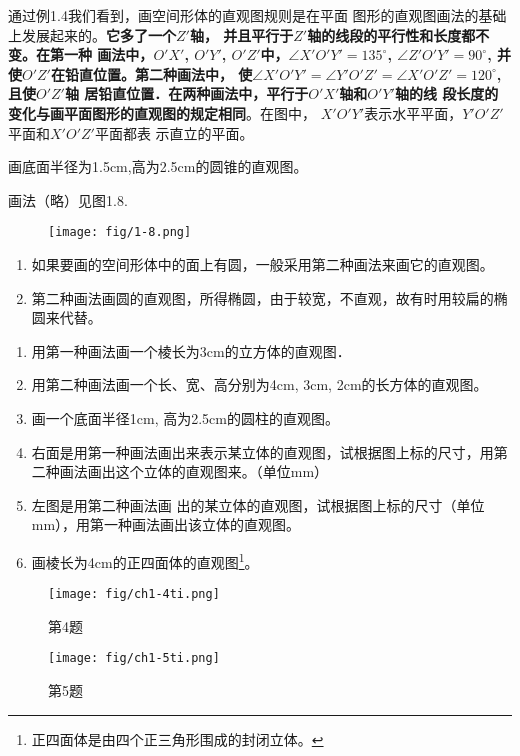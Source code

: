 通过例1.4我们看到，画空间形体的直观图规则是在平面
图形的直观图画法的基础上发展起来的。\textbf{它多了一个$Z'$轴，
并且平行于$Z'$轴的线段的平行性和长度都不变。在第一种
画法中，$O'X'$, $O'Y'$, $O'Z'$中，$\angle X'O'Y'=135^{\circ}$,
 $\angle Z'O'Y'=90^{\circ}$, 并使$O'Z'$在铅直位置。第二种画法中，
使$\angle X'O'Y'=\angle Y'O'Z'=\angle X'O'Z'=120^{\circ}$, 且使$O'Z'$轴
居铅直位置．在两种画法中，平行于$O'X'$轴和$O'Y'$轴的线
段长度的变化与画平面图形的直观图的规定相同}。在图中，
$X'O'Y'$表示水平平面，$Y'O'Z'$平面和$X'O'Z'$平面都表
示直立的平面。

\begin{example}
画底面半径为1.5cm,高为2.5cm的圆锥的直观图。

画法（略）见图1.8.
\begin{figure}[htp]
    \centering
    \texttt{[image: fig/1-8.png]}
    \caption{}
\end{figure}
\end{example}

\begin{rmk}
\begin{enumerate}
    \item 如果要画的空间形体中的面上有圆，一般采用第二种画法来画它的直观图。
    \item 第二种画法画圆的直观图，所得椭圆，由于较宽，不直观，故有时用较扁的椭圆来代替。
\end{enumerate}
\end{rmk}


\begin{ex}
\begin{enumerate}
    \item 用第一种画法画一个棱长为3cm的立方体的直观图．
    \item 用第二种画法画一个长、宽、高分别为4cm, 3cm, 2cm的长方体的直观图。
    \item 画一个底面半径1cm, 高为2.5cm的圆柱的直观图。
    \item 右面是用第一种画法画出来表示某立体的直观图，试根据图上标的尺寸，用第二种画法画出这个立体的直观图来。（单位mm）
    \item 左图是用第二种画法画
    出的某立体的直观图，试根据图上标的尺寸（单位mm），用第一种画法画出该立体的直观图。
    \item 画棱长为4cm的正四面体的直观图\footnote{正四面体是由四个正三角形围成的封闭立体。}。
\end{enumerate}
\end{ex}



\begin{figure}[htp]
    \centering
    \begin{minipage}[t]{0.48\textwidth}
    \centering
        \texttt{[image: fig/ch1-4ti.png]}
    \caption*{第4题}
    \end{minipage}
    \begin{minipage}[t]{0.48\textwidth}
    \centering
\texttt{[image: fig/ch1-5ti.png]}
    \caption*{第5题}
    \end{minipage}
  \end{figure}

